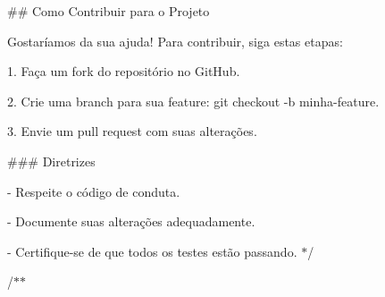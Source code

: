 
\begin{DoxyItemize}
\item 
\item \#\# Como Contribuir para o Projeto
\end{DoxyItemize}


\begin{DoxyItemize}
\item Gostaríamos da sua ajuda! Para contribuir, siga estas etapas\+:
\end{DoxyItemize}


\begin{DoxyItemize}
\item 1. Faça um fork do repositório no Git\+Hub.
\item 2. Crie uma branch para sua feature\+: {\ttfamily git checkout -\/b minha-\/feature}.
\item 3. Envie um pull request com suas alterações.
\end{DoxyItemize}


\begin{DoxyItemize}
\item \#\#\# Diretrizes
\item -\/ Respeite o código de conduta.
\item -\/ Documente suas alterações adequadamente.
\item -\/ Certifique-\/se de que todos os testes estão passando. $\ast$/
\end{DoxyItemize}

/$\ast$$\ast$
\begin{DoxyItemize}
\item 
\end{DoxyItemize}